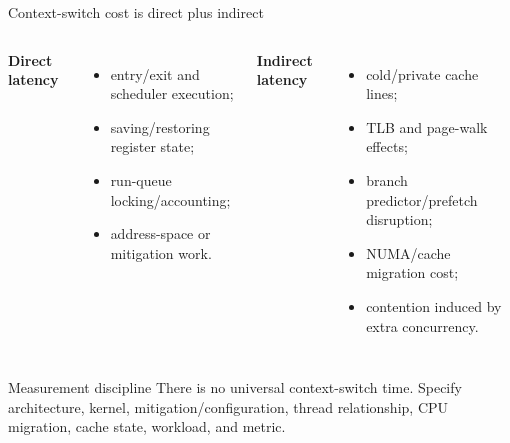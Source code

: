 \documentclass[aspectratio=169,11pt]{beamer}
\begin{document}
\begin{frame}{Context-switch cost is direct plus indirect}
  \begin{columns}[T,onlytextwidth]
      \textbf{Direct latency}
      \begin{itemize}
        \item entry/exit and scheduler execution;
        \item saving/restoring register state;
        \item run-queue locking/accounting;
        \item address-space or mitigation work.
      \end{itemize}
      \textbf{Indirect latency}
      \begin{itemize}
        \item cold/private cache lines;
        \item TLB and page-walk effects;
        \item branch predictor/prefetch disruption;
        \item NUMA/cache migration cost;
        \item contention induced by extra concurrency.
      \end{itemize}
  \end{columns}
  \begin{alertblock}{Measurement discipline}
    There is no universal context-switch time. Specify architecture, kernel, mitigation/configuration, thread relationship, CPU migration, cache state, workload, and metric.
  \end{alertblock}
\end{frame}
\end{document}
